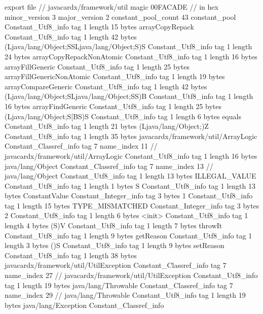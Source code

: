 export file {		// javacardx/framework/util
	magic	00FACADE		 // in hex
	minor_version	3
	major_version	2
	constant_pool_count	43
	constant_pool {
		Constant_Utf8_info {
			tag	1
			length	15
			bytes	arrayCopyRepack
		}
		Constant_Utf8_info {
			tag	1
			length	42
			bytes	(Ljava/lang/Object;SSLjava/lang/Object;S)S
		}
		Constant_Utf8_info {
			tag	1
			length	24
			bytes	arrayCopyRepackNonAtomic
		}
		Constant_Utf8_info {
			tag	1
			length	16
			bytes	arrayFillGeneric
		}
		Constant_Utf8_info {
			tag	1
			length	25
			bytes	arrayFillGenericNonAtomic
		}
		Constant_Utf8_info {
			tag	1
			length	19
			bytes	arrayCompareGeneric
		}
		Constant_Utf8_info {
			tag	1
			length	42
			bytes	(Ljava/lang/Object;SLjava/lang/Object;SS)B
		}
		Constant_Utf8_info {
			tag	1
			length	16
			bytes	arrayFindGeneric
		}
		Constant_Utf8_info {
			tag	1
			length	25
			bytes	(Ljava/lang/Object;S[BS)S
		}
		Constant_Utf8_info {
			tag	1
			length	6
			bytes	equals
		}
		Constant_Utf8_info {
			tag	1
			length	21
			bytes	(Ljava/lang/Object;)Z
		}
		Constant_Utf8_info {
			tag	1
			length	35
			bytes	javacardx/framework/util/ArrayLogic
		}
		Constant_Classref_info {
			tag	7
			name_index	11		// javacardx/framework/util/ArrayLogic
		}
		Constant_Utf8_info {
			tag	1
			length	16
			bytes	java/lang/Object
		}
		Constant_Classref_info {
			tag	7
			name_index	13		// java/lang/Object
		}
		Constant_Utf8_info {
			tag	1
			length	13
			bytes	ILLEGAL_VALUE
		}
		Constant_Utf8_info {
			tag	1
			length	1
			bytes	S
		}
		Constant_Utf8_info {
			tag	1
			length	13
			bytes	ConstantValue
		}
		Constant_Integer_info {
			tag	3
			bytes	1
		}
		Constant_Utf8_info {
			tag	1
			length	15
			bytes	TYPE_MISMATCHED
		}
		Constant_Integer_info {
			tag	3
			bytes	2
		}
		Constant_Utf8_info {
			tag	1
			length	6
			bytes	<init>
		}
		Constant_Utf8_info {
			tag	1
			length	4
			bytes	(S)V
		}
		Constant_Utf8_info {
			tag	1
			length	7
			bytes	throwIt
		}
		Constant_Utf8_info {
			tag	1
			length	9
			bytes	getReason
		}
		Constant_Utf8_info {
			tag	1
			length	3
			bytes	()S
		}
		Constant_Utf8_info {
			tag	1
			length	9
			bytes	setReason
		}
		Constant_Utf8_info {
			tag	1
			length	38
			bytes	javacardx/framework/util/UtilException
		}
		Constant_Classref_info {
			tag	7
			name_index	27		// javacardx/framework/util/UtilException
		}
		Constant_Utf8_info {
			tag	1
			length	19
			bytes	java/lang/Throwable
		}
		Constant_Classref_info {
			tag	7
			name_index	29		// java/lang/Throwable
		}
		Constant_Utf8_info {
			tag	1
			length	19
			bytes	java/lang/Exception
		}
		Constant_Classref_info {
}}}
